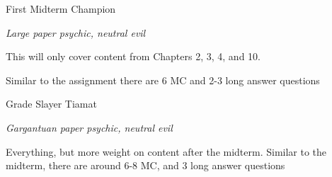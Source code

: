 \documentclass[../ECON-281-Notes.tex]{subfiles}
\begin{document}
\begin{monsterbox}{First Midterm Champion}
    \begin{hangingpar}
        \textit{Large paper psychic, neutral evil}
    \end{hangingpar}
    \dndline
    \basics[
        armorclass = 30,
        hitpoints = 100,
        speed = {75 minutes},
    ]
    \dndline
    \stats[
        STR = \stat{23},
        DEX = \stat{14},
        CON = \stat{21},
        INT = \stat{16},
        WIS = \stat{13},
        CHA = \stat{20},
    ]
    \dndline
    \details[
        languages = {Algebra, Calculus, Microeconomics},
        challenge = {8},
    ]
    \dndline
    This will only cover content from Chapters 2, 3, 4, and 10.
    \begin{monsteraction}
        Similar to the assignment there are 6 MC and 2-3 long answer questions
    \end{monsteraction}
\end{monsterbox}

\begin{monsterbox}{Grade Slayer Tiamat}
    \begin{hangingpar}
        \textit{Gargantuan paper psychic, neutral evil}
    \end{hangingpar}
    \dndline
    \basics[
        armorclass = 50,
        hitpoints = 100,
        speed = {120 minutes},
    ]
    \dndline
    \stats[
        STR = \stat{30},
        DEX = \stat{14},
        CON = \stat{29},
        INT = \stat{18},
        WIS = \stat{17},
        CHA = \stat{28},
    ]
    \dndline
    \details[
        languages = {Algebra, Calculus,  Microeconomics},
        challenge = {23},
    ]
    \dndline
    Everything, but more weight on content after the midterm. 
    Similar to the midterm, there are around 6-8 MC, and 3 long answer questions
\end{monsterbox}
\end{document}
